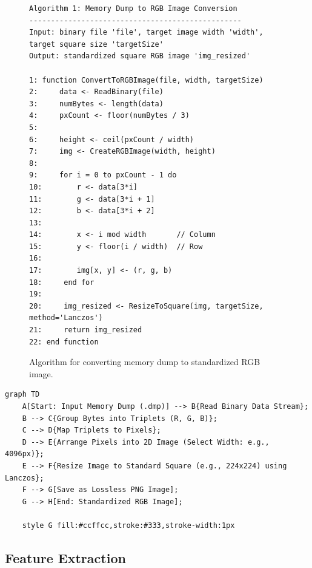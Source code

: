 \begin{figure}[h!]
\centering
\begin{verbatim}
Algorithm 1: Memory Dump to RGB Image Conversion
-------------------------------------------------
Input: binary file 'file', target image width 'width', target square size 'targetSize'
Output: standardized square RGB image 'img_resized'

1: function ConvertToRGBImage(file, width, targetSize)
2:     data <- ReadBinary(file)
3:     numBytes <- length(data)
4:     pxCount <- floor(numBytes / 3)
5:     
6:     height <- ceil(pxCount / width)
7:     img <- CreateRGBImage(width, height)
8:     
9:     for i = 0 to pxCount - 1 do
10:        r <- data[3*i]
11:        g <- data[3*i + 1]
12:        b <- data[3*i + 2]
13:        
14:        x <- i mod width       // Column
15:        y <- floor(i / width)  // Row
16:        
17:        img[x, y] <- (r, g, b)
18:     end for
19:     
20:     img_resized <- ResizeToSquare(img, targetSize, method='Lanczos')
21:     return img_resized
22: end function
\end{verbatim}
\caption{Algorithm for converting memory dump to standardized RGB image.}
\label{alg:rgb_conversion}
\end{figure}

\begin{verbatim}
graph TD
    A[Start: Input Memory Dump (.dmp)] --> B{Read Binary Data Stream};
    B --> C{Group Bytes into Triplets (R, G, B)};
    C --> D{Map Triplets to Pixels};
    D --> E{Arrange Pixels into 2D Image (Select Width: e.g., 4096px)};
    E --> F{Resize Image to Standard Square (e.g., 224x224) using Lanczos};
    F --> G[Save as Lossless PNG Image];
    G --> H[End: Standardized RGB Image];

    style G fill:#ccffcc,stroke:#333,stroke-width:1px
\end{verbatim}

\subsection{Feature Extraction}
\label{subsec:feature_extraction_impl}

